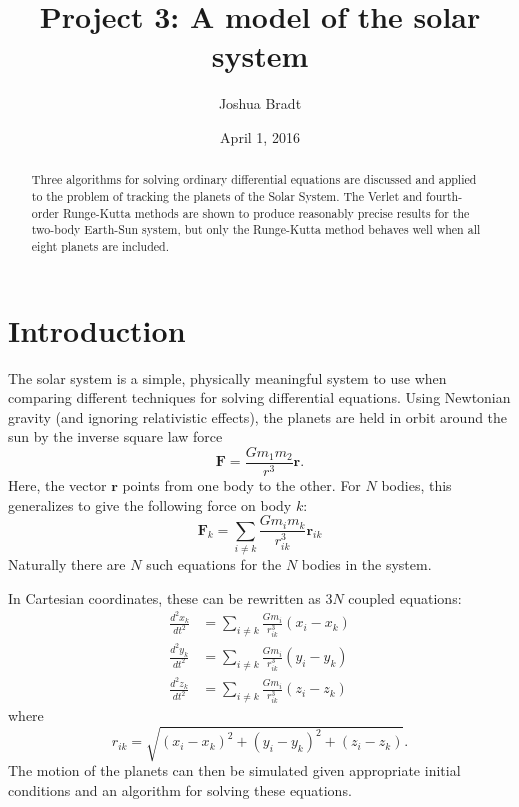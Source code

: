 \documentclass[aps,prc,reprint,nobalancelastpage]{revtex4-1}
\begin{document}
\title{Project 3: A model of the solar system}
\author{Joshua Bradt}
\noaffiliation
\date{April 1, 2016}

\begin{abstract}
    Three algorithms for solving ordinary differential equations are discussed and applied to the problem of tracking the planets of the Solar System. The Verlet and fourth-order Runge-Kutta methods are shown to produce reasonably precise results for the two-body Earth-Sun system, but only the Runge-Kutta method behaves well when all eight planets are included.
\end{abstract}

\maketitle

\section{Introduction}
\label{sec:introduction}

    The solar system is a simple, physically meaningful system to use when comparing different techniques for solving differential equations. Using Newtonian gravity (and ignoring relativistic effects), the planets are held in orbit around the sun by the inverse square law force
    \begin{equation*}
        \mathbf{F} = \frac{G m_1 m_2}{r^3} \mathbf{r}.
    \end{equation*}
    Here, the vector $\mathbf{r}$ points from one body to the other. For $N$ bodies, this generalizes to give the following force on body $k$:
    \begin{equation*}
        \mathbf{F}_k = \sum_{i \neq k} \frac{G m_i m_k}{r_{ik}^3} \mathbf{r}_{ik}
    \end{equation*}
    Naturally there are $N$ such equations for the $N$ bodies in the system.

    In Cartesian coordinates, these can be rewritten as $3N$ coupled equations:
    \begin{align*}
        \frac{d^2 x_k}{dt^2} &= \sum_{i \neq k} \frac{G m_i}{r_{ik}^3} (x_i - x_k) \\
        \frac{d^2 y_k}{dt^2} &= \sum_{i \neq k} \frac{G m_i}{r_{ik}^3} (y_i - y_k) \\
        \frac{d^2 z_k}{dt^2} &= \sum_{i \neq k} \frac{G m_i}{r_{ik}^3} (z_i - z_k)
    \end{align*}
    where
    \begin{equation*}
        r_{ik} = \sqrt{(x_i - x_k)^2 + (y_i - y_k)^2 + (z_i - z_k)}.
    \end{equation*}
    The motion of the planets can then be simulated given appropriate initial conditions and an algorithm for solving these equations.
\end{document}
